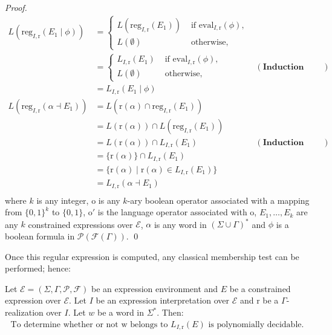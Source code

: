 \documentclass[a4paper]{llncs}
\begin{document}
\begin{proof}
\begin{align*}
      L(\mathrm{reg}_{I,\mathrm{r}}(E_1\mid\phi)) & =
         \begin{cases}
             L(\mathrm{reg}_{I,\mathrm{r}}(E_1)) & \text{ if } \mathrm{eval}_{I,\mathrm{r}}(\phi),\\
             L(\emptyset) & \text{ otherwise,}
         \end{cases}\\
         & =
         \begin{cases}
             L_{I,\mathrm{r}}(E_1) & \text{ if } \mathrm{eval}_{I,\mathrm{r}}(\phi),\\
             L(\emptyset) & \text{ otherwise,}
         \end{cases}&(\textbf{Induction hypothesis})\\
         & = L_{I,\mathrm{r}}(E_1\mid\phi)\\
         L(\mathrm{reg}_{I,\mathrm{r}}(\alpha \dashv E_1)) & = L(\mathrm{r}(\alpha) \cap \mathrm{reg}_{I,\mathrm{r}}(E_1))\\
      & = L(\mathrm{r}(\alpha)) \cap L(\mathrm{reg}_{I,\mathrm{r}}(E_1))\\
      & = L(\mathrm{r}(\alpha)) \cap L_{I,\mathrm{r}}(E_1)&(\textbf{Induction hypothesis})\\
      & = \{\mathrm{r}(\alpha)\} \cap L_{I,\mathrm{r}}(E_1)\\
      & = \{\mathrm{r}(\alpha)\mid \mathrm{r}(\alpha)\in  L_{I,\mathrm{r}}(E_1)\}\\
      & = L_{I,\mathrm{r}}(\alpha \dashv E_1)\\
    \end{align*}
    where $k$ is any integer, $\mathrm{o}$ is any $k$-ary boolean operator associated with a mapping from $\{0,1\}^k$ to $\{0,1\}$, $\mathrm{o}'$ is the language operator associated with $\mathrm{o}$, $E_1,\ldots,E_k$ are any $k$ constrained expressions over $\mathcal{E}$, $\alpha$ is any word in $(\Sigma\cup \Gamma)^*$ and $\phi$ is a boolean formula in $\mathcal{P}(\mathcal{F}(\Gamma))$.
    \qed
  \end{proof}
  
 Once this regular
expression is computed, any classical membership test can be performed; hence:
  
  \begin{corollary}\label{cor i r lang rat}
    Let $\mathcal{E}=(\Sigma,\Gamma,\mathcal{P},\mathcal{F})$ be an expression environment and $E$ be a constrained expression over $\mathcal{E}$. Let $I$ be an expression interpretation over $\mathcal{E}$ and $\mathrm{r}$ be a $\Gamma$-realization over $I$. Let $w$ be a word in $\Sigma^*$. Then:
    \begin{align*}
      \text{To determine whether or not w belongs to } L_{I,\mathrm{r}}(E) \text{ is polynomially decidable.}
    \end{align*}
  \end{corollary}
  
\end{document}
